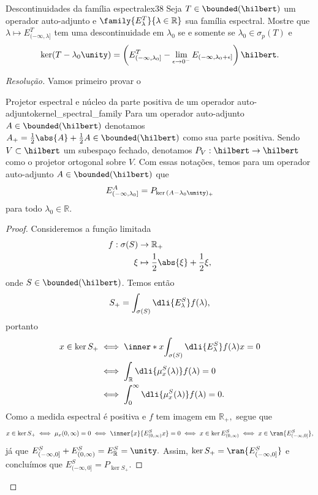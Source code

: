 \begin{exercício}{Descontinuidades da família espectral}{ex38}
  Seja \(T\in\bounded(\hilbert)\) um operador auto-adjunto e \(\family{E_\lambda^T}{\lambda \in \mathbb{R}}\) sua família espectral. Mostre que \(\lambda \mapsto E^T_{(-\infty, \lambda]}\) tem uma descontinuidade em \(\lambda_0\) se e somente se \(\lambda_0 \in \sigma_p(T)\) e
  \begin{equation*}
    \ker(T - \lambda_0\unity) = \left(E^T_{(-\infty, \lambda_0]} - \lim_{\epsilon\to 0^{-}}{E_{(-\infty, \lambda_0 + \epsilon]}}\right)\hilbert.
  \end{equation*}
\end{exercício}
\begin{proof}[Resolução]
  Vamos primeiro provar o
  \begin{lemma}{Projetor espectral e núcleo da parte positiva de um operador auto-adjunto}{kernel_spectral_family}
    Para um operador auto-adjunto \(A \in \bounded(\hilbert)\) denotamos \(A_+ = \frac12 \abs{A} + \frac12A \in \bounded(\hilbert)\) como sua parte positiva. Sendo \(V \subset \hilbert\) um subespaço fechado, denotamos \(P_V : \hilbert \to \hilbert\) como o projetor ortogonal sobre \(V.\) Com essas notações, temos para um operador auto-adjunto \(A \in \bounded(\hilbert)\) que
    \begin{equation*}
      E^A_{(-\infty, \lambda_0]} = P_{\ker{(A - \lambda_0\unity)_+}}
    \end{equation*}
    para todo \(\lambda_0 \in \mathbb{R}.\)
  \end{lemma}
  \begin{proof}
    Consideremos a função limitada
    \begin{align*}
      f : \sigma(S) &\to \mathbb{R}_+\\
                \xi &\mapsto \frac12\abs{\xi} + \frac12\xi,
    \end{align*}
    onde \(S \in \bounded(\hilbert)\). Temos então
    \begin{equation*}
      S_+ = \int_{\sigma(S)} \dli{E^S_\lambda} f(\lambda),
    \end{equation*}
    portanto
    \begin{align*}
      x \in \ker{S_+} &\iff \inner*{x}{\int_{\sigma(S)}\dli{E_\lambda^S} f(\lambda)x} = 0\\
                      &\iff \int_{\mathbb{R}} \dli{\mu^S_x(\lambda)} f(\lambda) = 0\\
                      &\iff \int_0^\infty \dli{\mu^S_x(\lambda)} f(\lambda) = 0.
    \end{align*}
    Como a medida espectral é positiva e \(f\) tem imagem em \(\mathbb{R}_+,\) segue que
    \begin{equation*}
      x \in \ker{S_+} \iff \mu_x(0,\infty) = 0 \iff \inner{x}{E_{(0,\infty)}^Sx} = 0 \iff x \in \ker{E_{(0,\infty)}^S} \iff x \in \ran{E^S_{(-\infty, 0]}},
    \end{equation*}
    já que \(E^S_{(-\infty, 0]} + E^S_{(0,\infty)} = E^S_{\mathbb{R}} = \unity.\) Assim, \(\ker{S_+} = \ran{E^S_{(-\infty, 0]}}\) e concluímos que \(E^S_{(-\infty, 0]} = P_{\ker{S_+}}.\)


\end{proof}
\end{proof}
